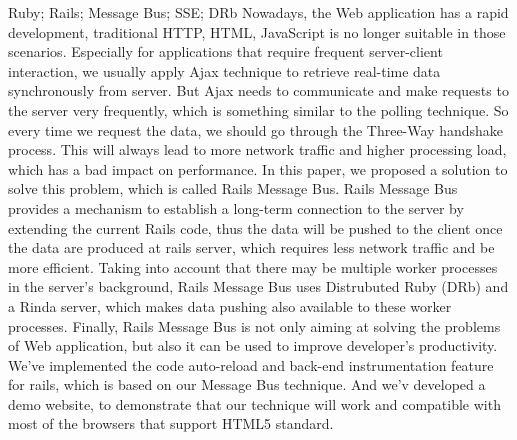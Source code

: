 \makecover


\begin{abstract}{Ruby;  Rails;  消息总线;  SSE;  DRb}
近年来，随着Web应用的快速发展，传统基于HTTP+HTML+JavaScript的网站开发技术在应对这些新场景时已经显出了颓势。特别是对于需要频繁和服务器交互的Web应用，传统上我们一般使用Ajax来从后台异步获取实时数据。但是该技术需要不断的向服务器请求数据，这种类似轮询的方式使得每次请求数据时都得经过“三次握手”等繁琐初始化过程，这既带来了较高的网络流量又引发了较大的处理负荷，从而影响了执行效率。
针对Rails服务器，本文提出了一种可行的解决技术，称之为Rails消息总线。Rails消息总线技术通过扩展Rails现有代码，使得服务器能够和浏览器建立一个长连接提供数据，这样只要服务器端产生任何数据，都能够实时地推送到浏览器端，减少了不必要的网络流量，提升了处理效率。同时，考虑到服务器后端可能有多个进程进行处理，Rails消息总线技术使用了分布式Ruby（DRb）和Rinda，使得服务器上的后台工作进程亦能够向浏览器发送数据。
最后，Rails消息总线技术不仅仅适用于解决Web应用的难题，同时亦能被用于提升开发者效率。本文利用消息总线技术，简单地实现了Rails服务器在开发模式下代码自动重载以及后端性能评测的两套开发者工具。并同时开发一个示例网站，验证了本技术确实能够实现功能并和现有的大部分支持HTML5新技术的主流浏览器相兼容。
\end{abstract}


\begin{abstractEng}{Ruby; Rails; Message Bus; SSE; DRb}
Nowadays, the Web application has a rapid development, traditional HTTP, HTML, JavaScript is no longer suitable in those scenarios. Especially for applications that require frequent server-client interaction, we usually apply Ajax technique to retrieve real-time data synchronously from server. But Ajax needs to communicate and make requests to the server very frequently, which is something similar to the polling technique. So every time we request the data, we should go through the Three-Way handshake process. This will always lead to more network traffic and higher processing load, which has a bad impact on performance.
In this paper, we proposed a solution to solve this problem, which is called Rails Message Bus. Rails Message Bus provides a mechanism to establish a long-term connection to the server by extending the current Rails code, thus the data will be pushed to the client once the data are produced at rails server, which requires less network traffic and be more efficient. Taking into account that there may be multiple worker processes in the server's background, Rails Message Bus uses Distrubuted Ruby (DRb) and a Rinda server, which makes data pushing also available to these worker processes.
Finally, Rails Message Bus is not only aiming at solving the problems of Web application, but also it can be used to improve developer's productivity. We've implemented the code auto-reload and back-end instrumentation feature for rails, which is based on our Message Bus technique. And we'v developed a demo website, to demonstrate that our technique will work and compatible with most of the browsers that support HTML5 standard.
\end{abstractEng}


\tableofcontents